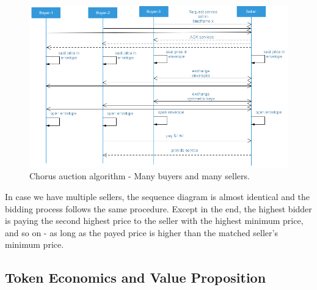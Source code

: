 \documentclass{llncs}
\begin{document}
{			\begin{figure}
				\centering
				\includegraphics[scale=0.4]{Figures/auction/20180501_auction-aglorithms--X-to-X.png}
				\caption{Chorus auction algorithm - Many buyers and many sellers.}	
				\label{fig:auction-algorithm-X-X}
			\end{figure}			
			In case we have multiple sellers, the sequence diagram is almost identical and the bidding process follows the same procedure. Except in the end, the highest bidder is paying the second highest price to  the seller with the highest minimum price, and so on - as long as the payed price is higher than the matched seller's minimum price.
			 


		\subsection{Token Economics and Value Proposition}
			\label{ss:token-economics}

}
\end{document}
